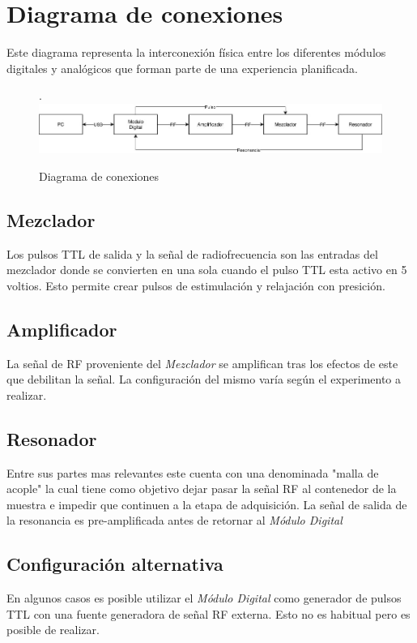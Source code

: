 \section{Diagrama de conexiones}

Este diagrama representa la interconexi\'on f\'isica entre los diferentes m\'odulos digitales y anal\'ogicos que forman
parte de una experiencia planificada.

\begin{figure}[!htb].
    \includegraphics[width=\linewidth]{../figures/d4.jpg}
    \caption{Diagrama de conexiones}
    \label{fig:d4}
\end{figure}
  

\subsection{Mezclador}

Los pulsos TTL de salida y la se\~nal de radiofrecuencia son las entradas del mezclador
donde se convierten en una sola cuando el pulso TTL esta activo en 5 voltios.
Esto permite crear pulsos de estimulaci\'on y relajaci\'on con presici\'on.

\subsection{Amplificador}
La se\~nal de RF proveniente del \textit{Mezclador} se amplifican tras los efectos de este que debilitan la se\~nal.
La configuraci\'on del mismo var\'ia seg\'un el experimento a realizar.

\subsection{Resonador}
Entre sus partes mas relevantes este cuenta con una denominada "malla de acople" la cual
tiene como objetivo dejar pasar la se\~nal RF al contenedor de la muestra e impedir
que continuen a la etapa de adquisici\'on.
La se\~nal de salida de la resonancia es pre-amplificada antes de retornar al \textit{M\'odulo Digital}

\subsection{Configuraci\'on alternativa}
En algunos casos es posible utilizar el \textit{M\'odulo Digital} como generador de pulsos TTL con una fuente
generadora de se\~nal RF externa. Esto no es habitual pero es posible de realizar.

\newpage
